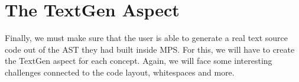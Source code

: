 \section{The TextGen Aspect}
Finally, we must make sure that the user is able to generate a real text source code out of the AST they had built inside MPS.
For this, we will have to create the TextGen aspect for each concept.
Again, we will face some interesting challenges connected to the code layout, whitespaces and more.

